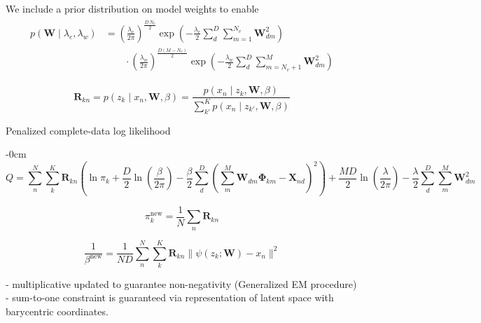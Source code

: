 \documentclass[remotesensing,article,submit,pdftex,moreauthors]{Definitions/mdpi}
\begin{document}
We include a prior distribution on model weights to enable
\begin{align}\label{eq:weight-prior}
\begin{split}
    p(\mathbf{W} \mid \lambda_e, \lambda_w) &= \left(\frac{\lambda_e}{2\pi}\right)^{\frac{D\,N_v}{2}}\exp\left(-\frac{\lambda_e}{2}\sum\limits_d^D\sum\limits_{m=1}^{N_v}\mathbf{W}_{dm}^2 \right)\\ 
    & \qquad \cdot \left(\frac{\lambda_w}{2\pi}\right)^{\frac{D(M-N_v)}{2}}\exp\left(-\frac{\lambda_w}{2}\sum\limits_d^D\sum_{m=N_v+1}^M \mathbf{W}_{dm}^2\right)
\end{split}
\end{align}

\begin{equation}\label{eq:responsibility}
    \mathbf{R}_{kn}  = p(z_k \mid x_n, \mathbf{W}, \beta) = \dfrac{p(x_n \mid z_k, \mathbf{W}, \beta)}{\sum\limits_{k'}^K p(x_n \mid z_{k'}, \mathbf{W}, \beta)}
\end{equation}

Penalized complete-data log likelihood
\begin{adjustwidth}{-\extralength}{0cm}
\begin{equation}\label{eq:complete-data-llh}
    Q = \sum\limits_n^N\sum\limits_k^K \mathbf{R}_{kn} \left(\ln\pi_k + \frac{D}{2}\ln\left(\frac{\beta}{2\pi}\right) - \frac{\beta}{2}\sum\limits_d^D\left(\sum\limits_m^M \mathbf{W}_{dm}\mathbf{\Phi}_{km} - \mathbf{X}_{nd}\right)^2\right) + \frac{MD}{2}\ln\left(\frac{\lambda}{2\pi}\right) - \frac{\lambda}{2}\sum\limits_d^D \sum\limits_m^M \mathbf{W}_{dm}^2
\end{equation}
\end{adjustwidth}


\begin{equation}\label{eq:pi-update}
    \pi_k^{\text{new}}  = \frac{1}{N}\sum_n \mathbf{R}_{kn}
\end{equation}

\begin{equation}\label{eq:beta-update}
    \frac{1}{\beta^{\text{new}}}  = \frac{1}{ND}\sum\limits_n^N\sum\limits_k^K \mathbf{R}_{kn}\lVert \psi(z_k; \mathbf{W}) - x_n \rVert^2
\end{equation}

- multiplicative updated to guarantee non-negativity (Generalized EM procedure)
- sum-to-one constraint is guaranteed via representation of latent space with barycentric coordinates.
\end{document}
